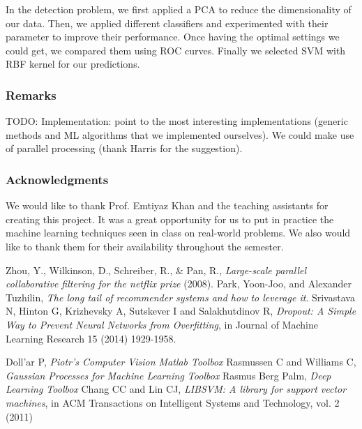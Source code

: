 \documentclass{article}
\begin{document}
  In the detection problem, we first applied a PCA to reduce the dimensionality of our data. Then, we applied different classifiers and experimented with their parameter to improve their performance. Once having the optimal settings we could get, we compared them using ROC curves. Finally we selected SVM with RBF kernel for our predictions.

    \subsubsection*{Remarks}
    TODO: Implementation: point to the most interesting implementations (generic methods and ML algorithms that we implemented ourselves). We could make use of parallel processing (thank Harris for the suggestion).

    \subsubsection*{Acknowledgments}
    We would like to thank Prof. Emtiyaz Khan and the teaching assistants for creating this project. It was a great opportunity for us to put in practice the machine learning techniques seen in class on real-world problems. We also would like to thank them for their availability throughout the semester.\\

    \begin{thebibliography}{99}

       Zhou, Y., Wilkinson, D., Schreiber, R., \& Pan, R., \textit{Large-scale parallel collaborative filtering for the netflix prize} (2008).
       Park, Yoon-Joo, and Alexander Tuzhilin, \textit{The long tail of recommender systems and how to leverage it}.
    	 Srivastava N, Hinton G, Krizhevsky A, Sutskever I and Salakhutdinov R, \textit{Dropout: A Simple Way to Prevent Neural Networks from Overfitting}, in Journal of Machine Learning Research 15 (2014) 1929-1958.

       Doll'ar P, \textit{Piotr's Computer Vision Matlab Toolbox}
       Rasmussen C and Williams C, \textit{Gaussian Processes for Machine Learning Toolbox}
       Rasmus Berg Palm, \textit{Deep Learning Toolbox}
       Chang CC and Lin CJ, \textit{LIBSVM: A library for support vector machines}, in ACM Transactions on Intelligent Systems and Technology, vol. 2 (2011)

    \end{thebibliography}
\end{document}
